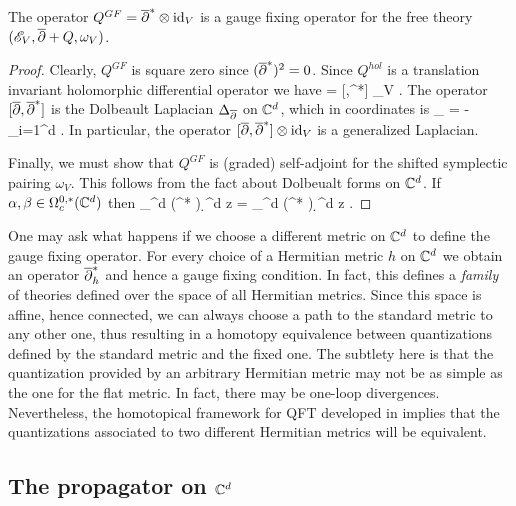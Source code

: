 \documentclass[10pt]{amsart}
\begin{document}
\begin{lem}
The operator $Q^{GF} = \overline{\partial}^* \otimes {\rm id}_V$ is a gauge fixing operator for the free theory $(\mathscr E_V, \overline{\partial} + Q, \omega_V)$.
\end{lem}
\begin{proof}
Clearly, $Q^{GF}$ is square zero since $(\overline{\partial}^*)^2 = 0$.
Since $Q^{hol}$ is a translation invariant holomorphic differential operator we have
 = [\dbar,\dbar^*] \tensor \id_{V} .
\een
The operator $[\overline{\partial},\overline{\partial}^*]$ is the Dolbeault Laplacian $\Delta_{\overline{\partial}}$ on $\mathbb C^d$, which 
in coordinates is
\ben
\Delta_{\dbar} = -\sum_{i=1}^d  .
\een
In particular, the operator $[\overline{\partial},\overline{\partial}^*] \otimes {\rm id}_{V}$ is a generalized Laplacian. 

Finally, we must show that $Q^{GF}$ is (graded) self-adjoint for the shifted symplectic pairing $\omega_V$. 
This follows from the fact about Dolbeualt forms on $\mathbb C^d$.
If $\alpha,\beta \in \Omega^{0,*}_c(\mathbb C^d)$ then
\ben 
\int_{\CC^d} (\dbar^* \alpha) \wedge \beta \wedge \d^d z = \pm \int_{\CC^d} \alpha \wedge (\dbar^* \beta) \wedge \d^d z .
\een
\end{proof}

\begin{rmk}
One may ask what happens if we choose a different metric on $\mathbb C^d$ to define the gauge fixing operator. 
For every choice of a Hermitian metric $h$ on $\mathbb C^d$ we obtain an operator $\overline{\partial}^*_h$ and hence a gauge fixing condition. 
In fact, this defines a {\em family} of theories defined over the space of all Hermitian metrics. 
Since this space is affine, hence connected, we can always choose a path to the standard metric to any other one, thus resulting in a homotopy equivalence between quantizations defined by the standard metric and the fixed one. 
The subtlety here is that the quantization provided by an arbitrary Hermitian metric may not be as simple as the one for the flat metric. 
In fact, there may be one-loop divergences. 
Nevertheless, the homotopical framework for QFT developed in \cite{CosRenorm} implies that the quantizations associated to two different Hermitian metrics will be equivalent. 
\end{rmk}

\subsection{The propagator on $\mathbb C^d$}
\end{document}
